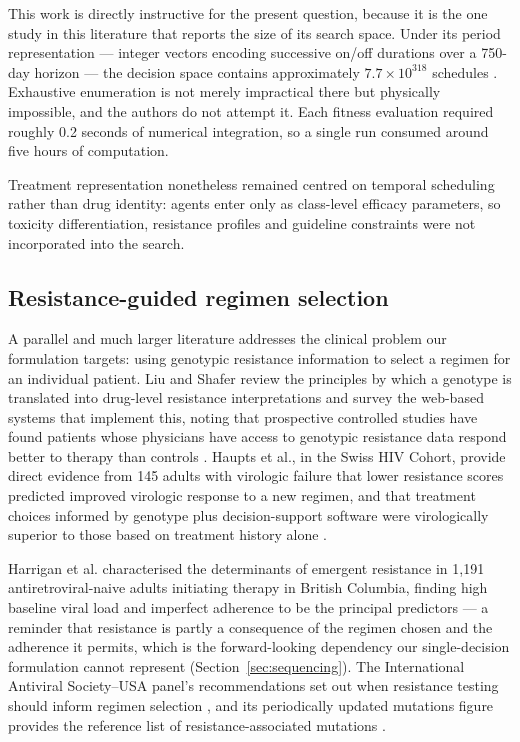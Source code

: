 \documentclass[conference]{IEEEtran}
\begin{document}
This work is directly instructive for the present question, because it is the one study in this literature that reports the size of its search space. Under its period representation --- integer vectors encoding successive on/off durations over a 750-day horizon --- the decision space contains approximately $7.7 \times 10^{318}$ schedules \cite{neri2007tcbb}. Exhaustive enumeration is not merely impractical there but physically impossible, and the authors do not attempt it. Each fitness evaluation required roughly 0.2 seconds of numerical integration, so a single run consumed around five hours of computation.

Treatment representation nonetheless remained centred on temporal scheduling rather than drug identity: agents enter only as class-level efficacy parameters, so toxicity differentiation, resistance profiles and guideline constraints were not incorporated into the search.

\subsection{Resistance-guided regimen selection}\label{sec:rw-resist}

A parallel and much larger literature addresses the clinical problem our formulation targets: using genotypic resistance information to select a regimen for an individual patient. Liu and Shafer review the principles by which a genotype is translated into drug-level resistance interpretations and survey the web-based systems that implement this, noting that prospective controlled studies have found patients whose physicians have access to genotypic resistance data respond better to therapy than controls \cite{liu2006}. Haupts et al., in the Swiss HIV Cohort, provide direct evidence from 145 adults with virologic failure that lower resistance scores predicted improved virologic response to a new regimen, and that treatment choices informed by genotype plus decision-support software were virologically superior to those based on treatment history alone \cite{haupts2003}.

Harrigan et al. characterised the determinants of emergent resistance in 1,191 antiretroviral-naive adults initiating therapy in British Columbia, finding high baseline viral load and imperfect adherence to be the principal predictors \cite{harrigan2005} --- a reminder that resistance is partly a consequence of the regimen chosen and the adherence it permits, which is the forward-looking dependency our single-decision formulation cannot represent (Section~\ref{sec:sequencing}). The International Antiviral Society--USA panel's recommendations set out when resistance testing should inform regimen selection \cite{gunthard2019}, and its periodically updated mutations figure provides the reference list of resistance-associated mutations \cite{wensing2019}.
\end{document}
